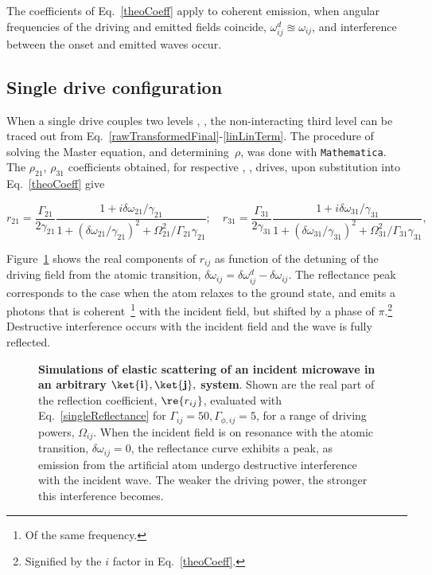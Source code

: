 \noindent The coefficients of Eq.~\eqref{theoCoeff} apply to coherent emission, when angular frequencies of the driving and emitted fields coincide, $ \omega^{d}_{ij} \approxeq\omega_{ij} $, and interference between the onset and emitted waves occur.  	

  \subsection{Single drive configuration\label{subsec:singleDrive}}
When a single drive couples two levels , , the non-interacting third level can be traced out from Eq.~\eqref{rawTransformedFinal}-\eqref{linLinTerm}. The procedure of solving the Master equation, and determining~$ \rho $, was done with \texttt{Mathematica}. The $ \rho_{21} $, $ \rho_{31} $ coefficients obtained, for respective \lra{}, \lra{}, drives, upon substitution into Eq.~\eqref{theoCoeff} give

\begin{equation}
r_{21}=\frac{\Gamma_{21}}{2\gamma_{21}}\frac{1+i\delta\omega_{21}/\gamma_{21}}{1+(\delta\omega_{21}/\gamma_{21})^2+\Omega_{21}^2/\Gamma_{21}\gamma_{21}}; \quad r_{31}=\frac{\Gamma_{31}}{2\gamma_{31}}\frac{1+i\delta\omega_{31}/\gamma_{31}}{1+(\delta\omega_{31}/\gamma_{31})^2+\Omega_{31}^2/\Gamma_{31}\gamma_{31}},
\label{singleReflectance}
\end{equation}

Figure~\ref{singleDriveReflection} shows the real components of $ r_{ij} $ as function of the detuning of the driving field from the atomic transition, $ \delta\omega_{ij} = \delta\omega_{ij}^{d}-\delta\omega_{ij}$. The reflectance peak corresponds to the case when the atom relaxes to the ground state, and emits a photons that is coherent~\footnote{Of the same frequency.} with the incident field, but shifted by a phase of $ \pi $.\footnote{Signified by the $ i $ factor in Eq.~\eqref{theoCoeff}.} Destructive interference occurs with the incident field and the wave is fully reflected.

\begin{figure}[h]
	\caption{\small \textbf{Simulations of elastic scattering of an incident microwave in an arbitrary $ \mathbf{\ket{i}, \ket{j}}, $ system}. Shown are the real part of the reflection coefficient, $ \re{r_{ij}} $, evaluated with Eq.~\eqref{singleReflectance} for $ \Gamma_{ij}=50, \Gamma_{\phi,ij}=5 $, for a range of driving powers, $ \Omega_{ij} $. When the incident field is on resonance with the atomic transition, $ \delta\omega_{ij}=0  $, the reflectance curve exhibits a peak, as emission from the artificial atom undergo destructive interference with the incident wave. The weaker the driving power, the stronger this interference becomes.}
	\label{singleDriveReflection}
\end{figure}

